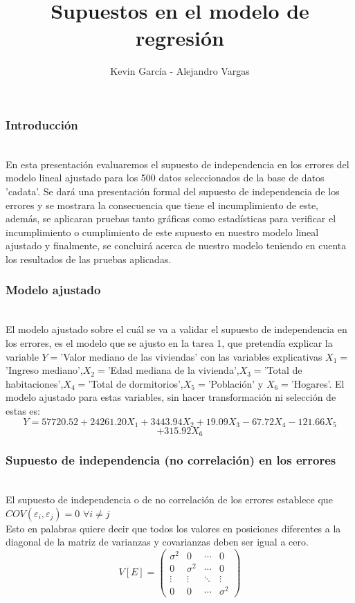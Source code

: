 \documentclass[12pt]{beamer}
\author{Kevin García - Alejandro Vargas}
\title{Supuestos en el modelo de regresión}
\begin{document}
\begin{frame}
\titlepage
\end{frame}

\begin{frame}
\frametitle{Introducción}
~\\En esta presentación evaluaremos el supuesto de independencia en los errores del modelo lineal ajustado para
los 500 datos seleccionados de la base de datos 'cadata'. Se dará una presentación formal del supuesto de
independencia de los errores y se mostrara la consecuencia que tiene el incumplimiento de este, además,
se aplicaran pruebas tanto gráficas como estadísticas para verificar el incumplimiento o cumplimiento
de este supuesto en nuestro modelo lineal ajustado y finalmente, se concluirá acerca de nuestro modelo
teniendo en cuenta los resultados de las pruebas aplicadas.
\end{frame}

\begin{frame}
\frametitle{Modelo ajustado}
~\\ El modelo ajustado sobre el cuál se va a validar el supuesto de independencia en los errores, es el modelo que se ajusto en la tarea 1, que pretendía explicar la variable $Y=$'Valor mediano de las viviendas' con las variables explicativas $X_{1}=$'Ingreso mediano',$X_{2}=$'Edad mediana de la vivienda',$X_{3}=$'Total de habitaciones',$X_{4}=$'Total de dormitorios',$X_{5}=$'Población' y $X_{6}=$'Hogares'. El modelo ajustado para estas variables, sin hacer transformación ni selección de estas es:
$$Y = 57720.52 + 24261.20X_{1} + 3443.94X_{2} + 19.09X_{3} - 67.72X_{4} - 121.66X_{5}$$ 
$$+315.92X_{6}$$
\end{frame}

\begin{frame}
\frametitle{Supuesto de independencia (no correlación) en los errores}
~\\ El supuesto de independencia o de no correlación de los errores establece que $COV(\varepsilon_{i},\varepsilon_{j})=0$ $\forall i\neq j$
~\\ Esto en palabras quiere decir que todos los valores en posiciones diferentes a la diagonal de la matriz de varianzas y covarianzas deben ser igual a cero.
~\\\[V[E]=
\left( \begin{array}{cccc}
 \sigma^2 & 0 & \cdots & 0 \\ 
 0 & \sigma^2 & \cdots & 0 \\
 \vdots & \vdots & \ddots & \vdots \\
 0 & 0 & \cdots & \sigma^2
\end{array} \right) \]

\end{frame}
\end{document}

